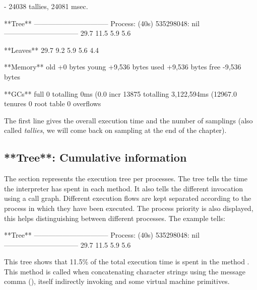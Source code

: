 \documentclass[a4paper,10pt,twoside]{book}
\begin{document}
\begin{code}

 - 24038 tallies, 24081 msec.

**Tree**
--------------------------------
Process: (40s)  535298048: nil
--------------------------------
29.7%
11.5%
  5.9%
  5.6%

**Leaves**
29.7%
9.2%
5.9%
5.6%
4.4%

**Memory**
	old			+0 bytes
	young		+9,536 bytes
	used		+9,536 bytes
	free		-9,536 bytes

**GCs**
	full			0 totalling 0ms (0.0%
	incr		13875 totalling 3,122,594ms (12967.0%
	tenures		0
	root table	0 overflows
\end{code}

The first line gives the overall execution time and the number of samplings (also called \emph{tallies}, we will come back on sampling at the end of the chapter). 

\subsection{**Tree**: Cumulative information}

The  section represents the execution tree per processes. The tree tells the time the \pharo interpreter has spent in each method. It also tells  the different invocation using a call graph. Different execution flows are kept separated according to the process in which they have been executed. The process priority is also displayed, this helps distinguishing between different processes. The example tells:

\begin{code}

**Tree**
--------------------------------
Process: (40s)  535298048: nil
--------------------------------
29.7%
11.5%
  5.9%
  5.6%
\end{code}

This tree shows that 11.5\% of the total execution time is spent in the method . This method is called when concatenating character strings using the message comma (\ct{,}), itself indirectly invoking  and some virtual machine primitives.
\end{document}

